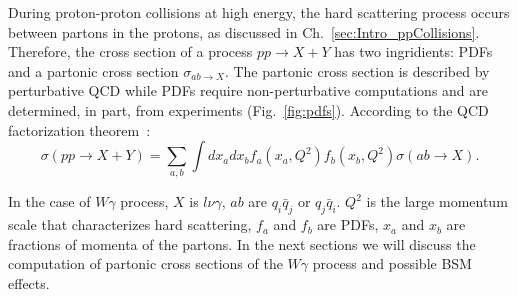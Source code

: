 During proton-proton collisions at high energy, the hard scattering process occurs between partons in the protons, as discussed in Ch.~\ref{sec:Intro_ppCollisions}. Therefore, the cross section of a process $pp \rightarrow X+Y$ has two ingridients: PDFs and a partonic cross section $\sigma_{ab\rightarrow X}$. The partonic cross section is described by perturbative QCD while PDFs require non-perturbative computations and are determined, in part, from experiments (Fig.~\ref{fig:pdfs}). According to the QCD factorization theorem~\cite{ref_HardScattering}:\\

\begin{equation}\label{eq:ppCS_general}
  \sigma(pp \rightarrow X+Y)= \sum_{a,b} \int dx_a dx_b f_a(x_a,Q^2) f_b(x_b, Q^2) \sigma(ab \rightarrow X).
\end{equation}

In the case of $W\gamma$ process, $X$ is $l \nu \gamma$, $ab$ are $q_i \bar{q}_j$ or $q_j \bar{q}_i$. $Q^2$ is the large momentum scale that characterizes hard scattering, $f_a$ and $f_b$ are PDFs, $x_a$ and $x_b$ are fractions of momenta of the partons. In the next sections we will discuss the computation of partonic cross sections of the $W\gamma$ process and possible BSM effects.\\

